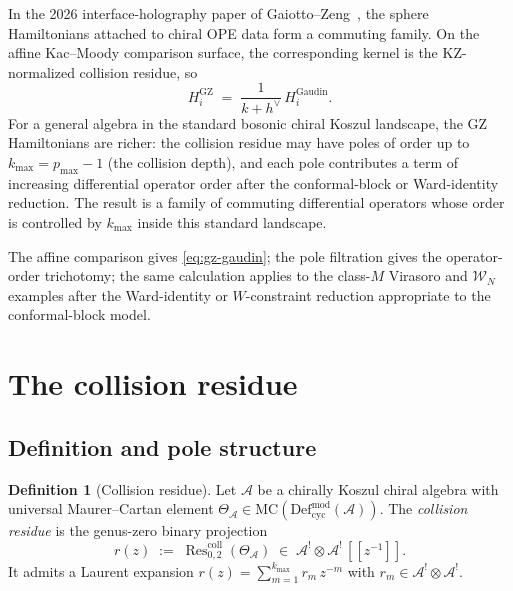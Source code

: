 \documentclass[11pt]{article}
\theoremstyle{plain}
\theoremstyle{definition}
\newtheorem{definition}[theorem]{Definition}
\theoremstyle{remark}
\newcommand{\cA}{\mathcal{A}}
\newcommand{\cW}{\mathcal{W}}
\newcommand{\Defcyc}{\mathrm{Def}_{\mathrm{cyc}}}
\newcommand{\MC}{\mathrm{MC}}
\newcommand{\Res}{\operatorname{Res}}
\numberwithin{equation}{section}
\begin{document}
In the 2026 interface-holography paper of Gaiotto--Zeng~\cite{GZ26},
the sphere Hamiltonians attached to chiral OPE data form a commuting
family. On the affine Kac--Moody comparison surface, the corresponding
kernel is the KZ-normalized collision residue, so
\begin{equation}\label{eq:gz-gaudin}
 H_i^{\mathrm{GZ}}
 \;=\;
 \frac{1}{k + h^\vee}
 \, H_i^{\mathrm{Gaudin}}.
\end{equation}
For a general algebra in the standard bosonic chiral Koszul landscape,
the GZ Hamiltonians are richer: the collision residue may have poles
of order up to $k_{\max} = p_{\max} - 1$ (the collision depth), and
each pole contributes a term of increasing differential operator
order after the conformal-block or Ward-identity reduction. The result
is a family of commuting differential operators whose order is
controlled by $k_{\max}$ inside this standard landscape.

The affine comparison gives \eqref{eq:gz-gaudin}; the pole filtration
gives the operator-order trichotomy; the same calculation applies to
the class-$M$ Virasoro and \(\cW_N\) examples after the Ward-identity
or \(W\)-constraint reduction appropriate to the conformal-block
model.

\section{The collision residue}\label{sec:collision}

\subsection{Definition and pole structure}

\begin{definition}[Collision residue]\label{def:collision-residue}
Let $\cA$ be a chirally Koszul chiral algebra with universal
Maurer--Cartan element $\Theta_\cA \in
\MC(\Defcyc^{\mathrm{mod}}(\cA))$. The \emph{collision residue}
is the genus-zero binary projection
\begin{equation}\label{eq:collision-residue-def}
 r(z)
 \;:=\;
 \Res^{\mathrm{coll}}_{0,2}(\Theta_\cA)
 \;\in\;
 \cA^! \otimes \cA^! \, [\![z^{-1}]\!].
\end{equation}
It admits a Laurent expansion
$r(z) = \sum_{m=1}^{k_{\max}} r_m \, z^{-m}$
with $r_m \in \cA^! \otimes \cA^!$.
\end{definition}
\end{document}
